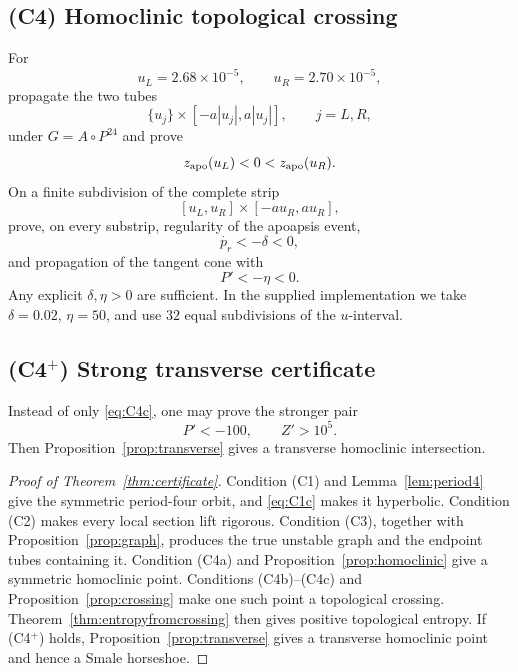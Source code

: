\documentclass[11pt]{article}
\newcommand{\pr}{p_r}
\begin{document}
\subsection*{(C4) Homoclinic topological crossing}

For
\[
 u_L=2.68\times10^{-5},
 \qquad
 u_R=2.70\times10^{-5},
\]
propagate the two tubes
\[
 \{u_j\}\times[-a|u_j|,a|u_j|],
 \qquad j=L,R,
\]
under $G=A\circ P^{24}$ and prove
\begin{equation}\label{eq:C4a}
 z_{\rm apo}(u_L)<0<z_{\rm apo}(u_R).
\end{equation}
On a finite subdivision of the complete strip
\[
 [u_L,u_R]\times[-au_R,au_R],
\]
prove, on every substrip, regularity of the apoapsis event,
\begin{equation}\label{eq:C4b}
 \dot{\pr}<-\delta<0,
\end{equation}
and propagation of the tangent cone with
\begin{equation}\label{eq:C4c}
 P'<-\eta<0.
\end{equation}
Any explicit $\delta,\eta>0$ are sufficient.  In the supplied implementation
we take $\delta=0.02$, $\eta=50$, and use $32$ equal subdivisions of the
$u$-interval.

\subsection*{(C4$^+$) Strong transverse certificate}

Instead of only \eqref{eq:C4c}, one may prove the stronger pair
\begin{equation}\label{eq:C4plus}
 P'<-100,\qquad Z'>10^5.
\end{equation}
Then Proposition~\ref{prop:transverse} gives a transverse homoclinic
intersection.

\begin{proof}[Proof of Theorem~\ref{thm:certificate}]
Condition (C1) and Lemma~\ref{lem:period4} give the symmetric period-four
orbit, and \eqref{eq:C1c} makes it hyperbolic.
Condition (C2) makes every local section lift rigorous.
Condition (C3), together with Proposition~\ref{prop:graph}, produces the true
unstable graph and the endpoint tubes containing it.
Condition (C4a) and Proposition~\ref{prop:homoclinic} give a symmetric
homoclinic point.
Conditions (C4b)--(C4c) and Proposition~\ref{prop:crossing} make one such
point a topological crossing.
Theorem~\ref{thm:entropyfromcrossing} then gives positive topological entropy.
If (C4$^+$) holds, Proposition~\ref{prop:transverse} gives a transverse
homoclinic point and hence a Smale horseshoe.
\end{proof}
\end{document}

